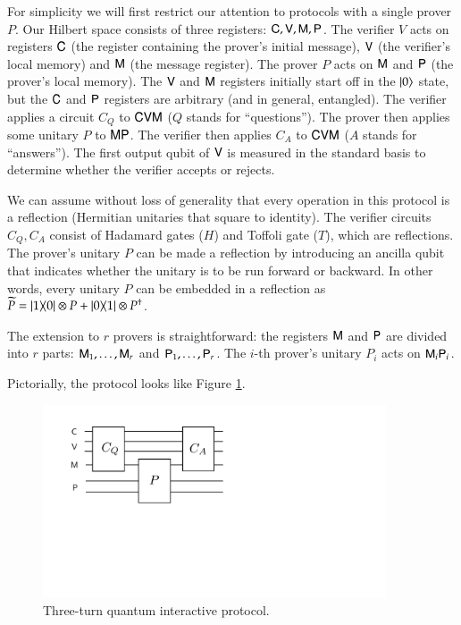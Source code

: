 For simplicity we will first restrict our attention to protocols with a single prover $P$. Our Hilbert space consists of three registers: ${\mathsf{C}}, {\mathsf{V}}, {\mathsf{M}}, {\mathsf{P}}$. The verifier $V$ acts on registers ${\mathsf{C}}$ (the register containing the prover's initial message), ${\mathsf{V}}$ (the verifier's local memory) and ${\mathsf{M}}$ (the message register). The prover $P$ acts on ${\mathsf{M}}$ and ${\mathsf{P}}$ (the prover's local memory). The ${\mathsf{V}}$ and ${\mathsf{M}}$ registers initially start off in the $|0\rangle$ state, but the ${\mathsf{C}}$ and ${\mathsf{P}}$ registers are arbitrary (and in general, entangled). The verifier applies a circuit $C_Q$ to ${\mathsf{C}} {\mathsf{V}} {\mathsf{M}}$ ($Q$ stands for ``questions''). The prover then applies some unitary $P$ to ${\mathsf{M}} {\mathsf{P}}$. The verifier then applies $C_A$ to ${\mathsf{C}} {\mathsf{V}} {\mathsf{M}}$ ($A$ stands for ``answers''). The first output qubit of ${\mathsf{V}}$ is measured in the standard basis to determine whether the verifier accepts or rejects.

We can assume without loss of generality that every operation in this protocol is a reflection (Hermitian unitaries that square to identity). The verifier circuits $C_Q,C_A$ consist of Hadamard gates ($H$) and Toffoli gate ($T$), which are reflections. The prover's unitary $P$ can be made a reflection by introducing an ancilla qubit that indicates whether the unitary is to be run forward or backward. In other words, every unitary $P$ can be embedded in a reflection as $\widetilde{P} = |1\rangle\! \langle 0| \otimes P + |0\rangle\! \langle 1| \otimes P^\dagger$. 

The extension to $r$ provers is straightforward: the registers ${\mathsf{M}}$ and ${\mathsf{P}}$ are divided into $r$ parts: ${\mathsf{M}}_1,\ldots,{\mathsf{M}}_r$ and ${\mathsf{P}}_1,\ldots,{\mathsf{P}}_r$. The $i$-th prover's unitary $P_i$ acts on ${\mathsf{M}}_i {\mathsf{P}}_i$. 

Pictorially, the protocol looks like Figure \ref{fig:qip}.

\begin{figure}[H]
\begin{center}
\includegraphics[width=4in]{graphics/qip3.pdf}
\end{center}
\caption{Three-turn quantum interactive protocol.}
\label{fig:qip}
\end{figure}

